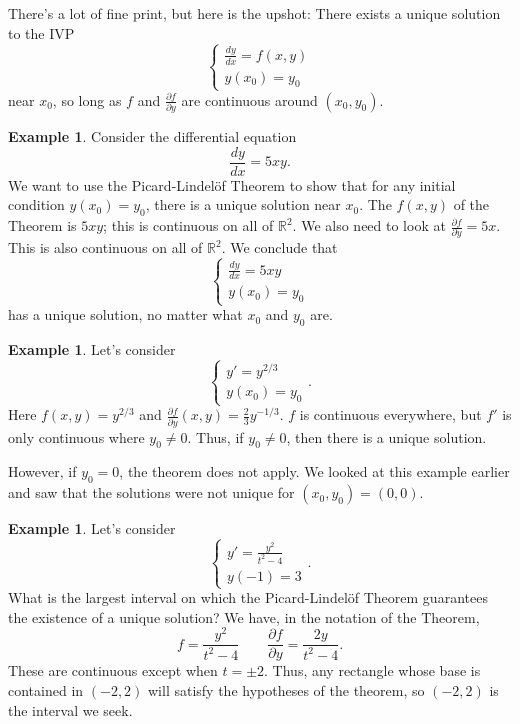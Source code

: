 \documentclass[12pt]{amsart}
\numberwithin{equation}{section}
\theoremstyle{plain} %
\theoremstyle{definition}
\newtheorem{ex}[equation]{Example}
\theoremstyle{remark}
\begin{document}
There's a lot of fine print, but here is the upshot: There exists a unique solution to the IVP
\[\begin{cases} \frac{dy}{dx} = f(x,y) \\ 
y(x_0) = y_0 \end{cases}\]
near $x_0$, so long as $f$ and $\frac{\partial f}{\partial y}$ are continuous around $(x_0,y_0)$.

\begin{ex} Consider the differential equation
\[ \frac{dy}{dx} = 5 xy.\]
We want to use the Picard-Lindel\"of Theorem to show that for any initial condition $y(x_0)=y_0$, there is a unique solution near $x_0$. The $f(x,y)$ of the Theorem is $5xy$; this is continuous on all of $\mathbb{R}^2$. We also need to look at $\frac{\partial f}{\partial y} = 5x$. This is also continuous on all of $\mathbb{R}^2$.
We conclude that 
\[\begin{cases} \frac{dy}{dx} = 5xy \\ 
y(x_0) = y_0 \end{cases}\]
has a unique solution, no matter what $x_0$ and $y_0$ are.
\end{ex}

\begin{ex} Let's consider
\[\begin{cases} y' = y^{2/3} \\ 
y(x_0) = y_0 \end{cases}.\]
Here $f(x,y) = y^{2/3}$ and $\frac{\partial f}{\partial y}(x,y) = \frac23 y^{-1/3}$. $f$ is continuous everywhere, but $f'$ is only continuous where $y_0\neq 0$.
Thus, if $y_0\neq 0$, then there is a unique solution.

However, if $y_0=0$, the theorem does not apply. We looked at this example earlier and saw that the solutions were not unique for $(x_0,y_0) = (0,0)$.
\end{ex}


\begin{ex} Let's consider
\[ \begin{cases} y' = \frac{y^2}{t^2-4} \\
y(-1) = 3 \end{cases}.\]
What is the largest interval on which the Picard-Lindel\"of Theorem guarantees the existence of a unique solution?
We have, in the notation of the Theorem,
\[ f = \frac{y^2}{t^2-4} \qquad \frac{\partial f}{\partial y}=\frac{2y}{t^2-4}.\]
These are continuous except when $t=\pm 2$. Thus, any rectangle whose base is contained in $(-2,2)$ will satisfy the hypotheses of the theorem, so $(-2,2)$ is the interval we seek.
\end{ex}
\end{document}
